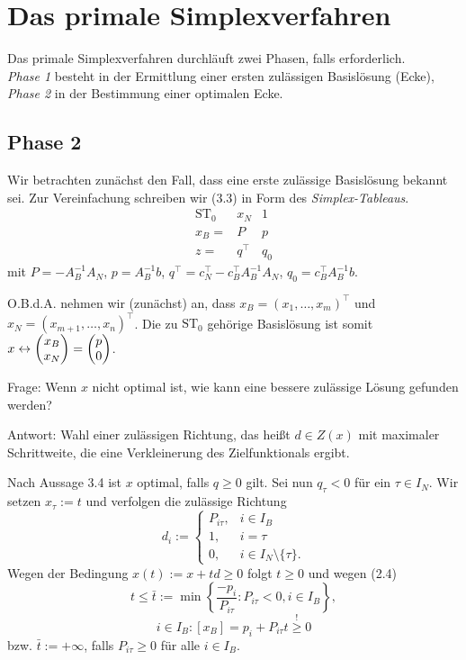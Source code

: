 \section{Das primale Simplexverfahren}
Das primale Simplexverfahren durchläuft zwei Phasen, falls erforderlich. \\
\emph{Phase 1} besteht in der Ermittlung einer ersten zulässigen Basislösung
(Ecke), \\
\emph{Phase 2} in der Bestimmung einer optimalen Ecke.

\subsection{Phase 2}
Wir betrachten zunächst den Fall, dass eine erste zulässige  Basislösung bekannt
sei. Zur Vereinfachung schreiben wir (3.3) in Form des \emph{Simplex-Tableaus}.
\begin{equation}
  \begin{array}{r|cc}
    \mathrm{ST}_0 & x_N & 1 \\
    \hline
    x_B = & P & p \\
    \hline
    z = & q^\top & q_0
  \end{array}
\end{equation}
mit $P = -A_B^{-1} A_N$, $p = A_B^{-1} b$, $q^\top = c_N^\top - c_B^\top A_B^{-1} A_N$,
$q_0 = c_B^\top A_B^{-1} b$.

O.B.d.A. nehmen wir (zunächst) an, dass $x_B = (x_1, \ldots, x_m)^\top$ und $x_N
= (x_{m+1}, \ldots, x_n)^\top$. Die zu $\mathrm{ST}_0$ gehörige Basislösung ist
somit $x \leftrightarrow \begin{pmatrix}x_B \\ x_N\end{pmatrix} = \begin{pmatrix}p \\ 0\end{pmatrix}$.

Frage: Wenn $x$ nicht optimal ist, wie kann eine bessere zulässige Lösung
gefunden werden?

Antwort: Wahl einer zulässigen Richtung, das heißt $d \in Z(x)$ mit maximaler
Schrittweite, die eine Verkleinerung des Zielfunktionals ergibt.

Nach Aussage 3.4 ist $x$ optimal, falls $q \ge 0$ gilt. Sei nun $q_\tau < 0$ für
ein $\tau \in I_N$. Wir setzen $x_\tau := t$ und verfolgen die zulässige
Richtung
\begin{equation}
  d_i := \begin{cases}
    P_{i\tau}, &i \in I_B \\
    1, &i = \tau \\
    0, &i \in I_N \setminus \{ \tau \}.
  \end{cases}
\end{equation}
Wegen der Bedingung $x(t) := x + td \ge 0$ folgt $t \ge 0$ und wegen (2.4)
\[ t \le \bar{t} := \min \left\{ \frac{-p_i}{P_{i\tau}} : P_{i\tau} < 0, i \in
    I_B \right\}, \]
\[ i \in I_B : [x_B] = p_i + P_{i\tau} t \overset{!}{\ge} 0 \]
bzw. $\bar{t} := + \infty$, falls $P_{i\tau} \ge 0$ für alle $i \in I_B$.

